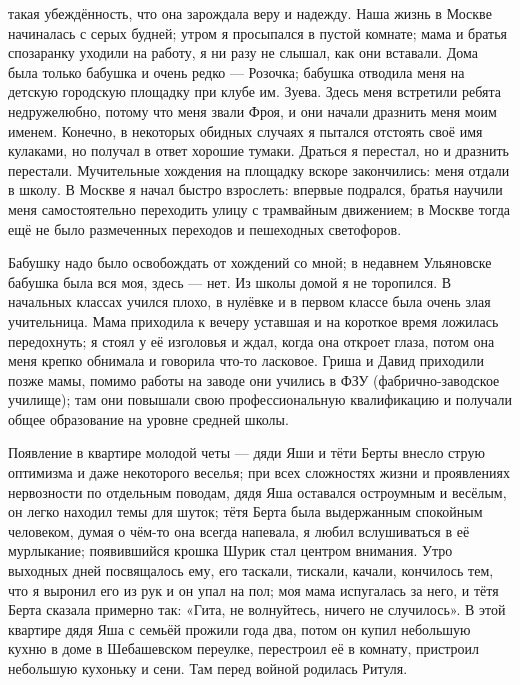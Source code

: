 \label{150-1}
такая убеждённость, что она зарождала веру и надежду. Наша жизнь в Москве начиналась с серых будней; утром я просыпался в пустой комнате; мама и братья спозаранку уходили на работу, я ни разу не слышал, как они вставали. Дома была только бабушка и очень редко — Розочка; бабушка отводила меня на детскую городскую площадку при клубе им. Зуева. Здесь меня встретили ребята недружелюбно, потому что меня звали Фроя, и они начали дразнить меня моим именем. Конечно, в некоторых обидных случаях я пытался отстоять своё имя кулаками, но получал в ответ хорошие тумаки. Драться я перестал, но и дразнить перестали. Мучительные хождения на площадку вскоре закончились: меня отдали в школу. В Москве я начал быстро взрослеть: впервые подрался, братья научили меня самостоятельно переходить улицу с трамвайным движением; в Москве тогда ещё не было размеченных переходов и пешеходных светофоров.

\label{151-1}
Бабушку надо было освобождать от хождений со мной; в недавнем Ульяновске бабушка была вся моя, здесь — нет. Из школы домой я не торопился. В начальных классах учился плохо, в нулёвке и в первом классе была очень злая учительница. Мама приходила к вечеру уставшая и на короткое время ложилась передохнуть; я стоял у её изголовья и ждал, когда она откроет глаза, потом она меня крепко обнимала и говорила что-то ласковое. Гриша и Давид приходили позже мамы, помимо работы на заводе они учились в ФЗУ (фабрично-заводское училище); там они повышали свою профессиональную квалификацию и получали общее образование на уровне средней школы.

\label{152-1}
Появление в квартире молодой четы — дяди Яши и тёти Берты внесло струю оптимизма и даже некоторого веселья; при всех сложностях жизни и проявлениях нервозности по отдельным поводам, дядя Яша оставался остроумным и весёлым, он легко находил темы для шуток; тётя Берта была выдержанным спокойным человеком, думая о чём-то она всегда напевала, я любил вслушиваться в её мурлыкание; появившийся крошка Шурик стал центром внимания. Утро выходных дней посвящалось ему, его таскали, тискали, качали, кончилось тем, что я выронил его из рук и он упал на пол; моя мама испугалась за него, и тётя Берта сказала примерно так: «Гита, не волнуйтесь, ничего не случилось». В этой квартире дядя Яша с семьёй прожили года два, потом он купил небольшую кухню в доме в Шебашевском переулке, перестроил её в комнату, пристроил небольшую кухоньку и сени. Там перед войной родилась Ритуля.

